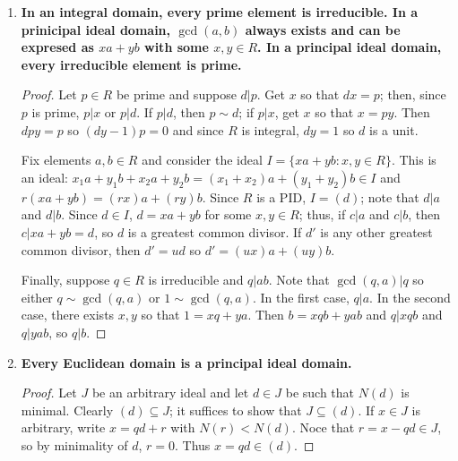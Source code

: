 \documentclass[12pt, a4paper]{article}
\theoremstyle{nonumberplain}
\newtheorem{proof}{Proof}
\begin{document}
\begin{enumerate}
\begin{proof}
            Otherwise, we assume $R$ has no zero divisors.
            Let $a\neq 0$, so $\{0\}\neq Ra\triangleleq R$ and $Ra=R$.
            Since $a\in R$, get $e\in R$ so that $ea=a$.
            Then if $b$ is arbitrary, $ba=bea$ so $(b-be)a=0$ and since $a\neq 0$, $b=be$.
            Since $R$ is commutative, $be=eb=b$ so $e\in R$ is an identity element
            Now if $x\neq 0$ is arbitrary, $Rx=R$ so there exists $y\in R$ so $yx=e$, so every $x$ has an inverse.
            Thus $R$ is a field.
        \end{proof}
    \item \textbf{In an integral domain, every prime element is irreducible.
            In a prinicipal ideal domain, $\gcd(a,b)$ always exists and can be expresed as $xa+yb$ with some $x,y\in R$.
            In a principal ideal domain, every irreducible element is prime.
        }
        \begin{proof}
            Let $p\in R$ be prime and suppose $d|p$.
            Get $x$ so that $dx=p$; then, since $p$ is prime, $p|x$ or $p|d$.
            If $p|d$, then $p\sim d$; if $p|x$, get $x$ so that $x=py$.
            Then $dpy=p$ so $(dy-1)p=0$ and since $R$ is integral, $dy=1$ so $d$ is a unit.
            
            Fix elements $a,b\in R$ and consider the ideal $I=\{xa+yb:x,y\in R\}$.
            This is an ideal: $x_1a+y_1b+x_2a+y_2b=(x_1+x_2)a+(y_1+y_2)b\in I$ and $r(xa+yb)=(rx)a+(ry)b$.
            Since $R$ is a PID, $I=(d)$; note that $d|a$ and $d|b$.
            Since $d\in I$, $d=xa+yb$ for some $x,y\in R$; thus, if $c|a$ and $c|b$, then $c|xa+yb=d$, so $d$ is a greatest common divisor.
            If $d'$ is any other greatest common divisor, then $d'=ud$ so $d'=(ux)a+(uy)b$.

            Finally, suppose $q\in R$ is irreducible and $q|ab$.
            Note that $\gcd(q,a)|q$ so either $q\sim\gcd(q,a)$ or $1\sim\gcd(q,a)$.
            In the first case, $q|a$.
            In the second case, there exists $x,y$ so that $1=xq+ya$.
            Then $b=xqb+yab$ and $q|xqb$ and $q|yab$, so $q|b$.
        \end{proof}
    \item \textbf{Every Euclidean domain is a principal ideal domain.}
        \begin{proof}
            Let $J$ be an arbitrary ideal and let $d\in J$ be such that $N(d)$ is minimal.
            Clearly $(d)\subseteq J$; it suffices to show that $J\subseteq (d)$.
            If $x\in J$ is arbitrary, write $x=qd+r$ with $N(r)<N(d)$.
            Noce that $r=x-qd\in J$, so by minimality of $d$, $r=0$.
            Thus $x=qd\in (d)$.
        \end{proof}
\end{enumerate}
\end{document}
